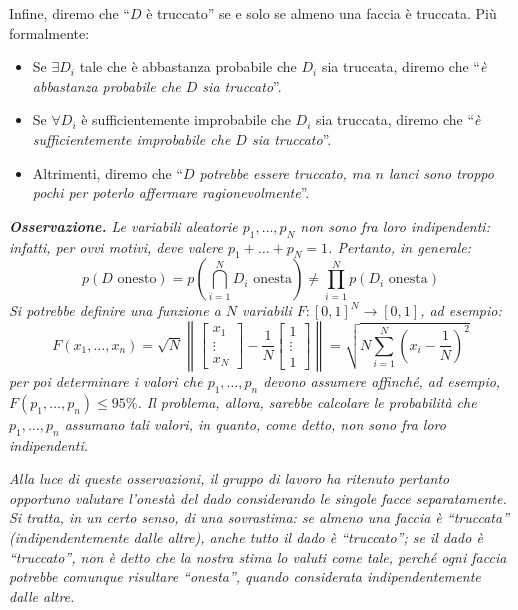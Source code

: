 \documentclass{article}
\begin{document}
\begin{appendices}
Infine, diremo che “$D$ è truccato” se e solo se almeno una faccia è truccata. Più formalmente:
\begin{itemize}
    \item Se $\exists D_i$ tale che è abbastanza probabile che $D_i$ sia truccata,
          diremo che “\emph{è abbastanza probabile che $D$ sia truccato}”.
    \item Se $\forall D_i$ è sufficientemente improbabile che $D_i$ sia truccata,
          diremo che “\emph{è sufficientemente improbabile che $D$ sia truccato}”.
    \item Altrimenti, diremo che
          “\emph{$D$ potrebbe essere truccato, ma $n$ lanci sono troppo pochi per poterlo
          affermare ragionevolmente}”.
\end{itemize}

\emph{\textbf{Osservazione.} Le variabili aleatorie $p_1,\dots,p_N$ non sono fra loro indipendenti:
infatti, per ovvi motivi, deve valere $p_1+\dots+p_N = 1$. Pertanto, in generale:}
\[p(D\text{ onesto})=p\left(\bigcap_{i=1}^N D_i\text{ onesta}\right)
\ne\prod_{i=1}^{N}p(D_i\text{ onesta})\]
\emph{Si potrebbe definire una funzione a $N$ variabili
$F:\left[0,1\right]^N\longrightarrow\left[0,1\right]$, ad esempio:}
\[F(x_1,\dots,x_n) = \sqrt{N}\left\lVert
\begin{bmatrix}x_1\\\vdots\\x_N\end{bmatrix} - \frac{1}{N}\begin{bmatrix}1\\\vdots\\1\end{bmatrix}
\right\rVert = \sqrt{N\sum_{i=1}^{N}\left(x_i-\frac{1}{N}\right)^2}\]
\emph{per poi determinare i valori che $p_1,\dots,p_n$ devono assumere affinché, ad esempio,
$F(p_1,\dots,p_n)\le95\%$. Il problema, allora, sarebbe calcolare le probabilità che
$p_1,\dots,p_n$ assumano tali valori, in quanto, come detto, non sono fra loro indipendenti.}

\emph{Alla luce di queste osservazioni, il gruppo di lavoro ha ritenuto pertanto
opportuno valutare l'onestà del dado considerando le singole facce separatamente.
Si tratta, in un certo senso, di una sovrastima: se almeno una faccia è “truccata”
(indipendentemente dalle altre), anche tutto il dado è “truccato”; se il dado è
“truccato”, non è detto che la nostra stima lo valuti come tale, perché ogni faccia
potrebbe comunque risultare “onesta”, quando considerata indipendentemente dalle
altre.}


\end{appendices}
\end{document}
